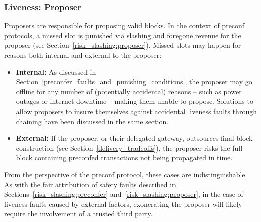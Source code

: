 \documentclass[a4paper]{article}
\theoremstyle{boldstyle}
\newcommand{\qb}[1]{\textcolor{red}{\textbf{Quentin:} #1}}
\newcommand{\todoqb}[1]{\todo[color=red!40]{\textbf{Quentin:} #1}}
\begin{document}
    
    \subsubsection{Liveness: Proposer}
    \label{risk_liveness:proposer}
    Proposers are responsible for proposing valid blocks. 
    In the context of preconf protocols, a missed slot is punished via slashing and foregone revenue for the proposer (see Section~\ref{risk_slashing:proposer}).
    Missed slots may happen for reasons both internal and external to the proposer: 
        \begin{itemize}
            \item \textbf{Internal:} As discussed in \hyperref[preconfer_faults_and_punishing_conditions]{Section~\ref{preconfer_faults_and_punishing_conditions}}, the proposer may go offline for any number of (potentially accidental) reasons -- such as power outages or internet downtime -- making them unable to propose. Solutions to allow proposers to insure themselves against accidental liveness faults through chaining have been discussed in the same section. 
            \item \textbf{External:} If the proposer, or their delegated gateway, outsources final block construction (see Section~\ref{delivery_tradeoffs}), the proposer risks the full block containing preconfed transactions not being propagated in time. 
        \end{itemize}
    From the perspective of the preconf protocol, these cases are indistinguishable. 
    As with the fair attribution of safety faults described in Sections~\ref{risk_slashing:preconfer} and~\ref{risk_slashing:proposer}, in the case of liveness faults caused by external factors, exonerating the proposer will likely require the involvement of a trusted third party. 
    
\end{document}
